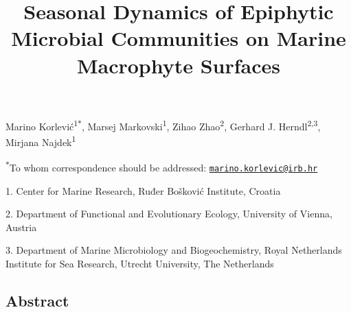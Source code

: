 \documentclass[12pt,]{article}
\title{\textbf{Seasonal Dynamics of Epiphytic Microbial Communities on Marine
Macrophyte Surfaces}}
\author{}
\date{}
\begin{document}
\maketitle

\vspace{50mm}

Marino Korlević\textsuperscript{1\(*\)}, Marsej
Markovski\textsuperscript{1}, Zihao Zhao\textsuperscript{2}, Gerhard J.
Herndl\textsuperscript{2,3}, Mirjana Najdek\textsuperscript{1}

\vspace{40mm}

\textsuperscript{\(*\)}To whom correspondence should be addressed:
\href{mailto:marino.korlevic@irb.hr}{\nolinkurl{marino.korlevic@irb.hr}}

1. Center for Marine Research, Ruđer Bošković Institute, Croatia

2. Department of Functional and Evolutionary Ecology, University of
Vienna, Austria

3. Department of Marine Microbiology and Biogeochemistry, Royal
Netherlands Institute for Sea Research, Utrecht University, The
Netherlands

\newpage
\linenumbers
{}
\setlength\parindent{24pt}

\hypertarget{abstract}{%
\subsection{Abstract}\label{abstract}}
\end{document}
